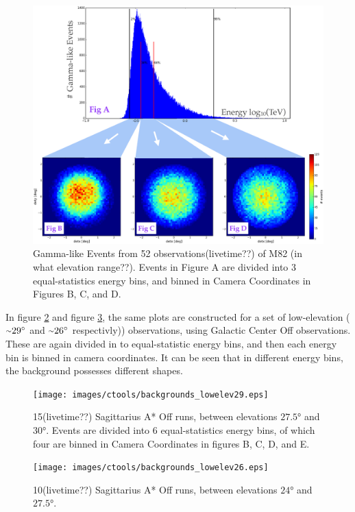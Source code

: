 \begin{figure}[ht]
  \begin{center}
    \includegraphics[width=\textwidth]{images/ctools/backgrounds_highelev.eps}
    \caption[FITS Background at High Elevations]{Gamma-like Events from 52 observations(livetime??) of M82 (in what elevation range??).  Events in Figure A are divided into 3 equal-statistics energy bins, and binned in Camera Coordinates in Figures B, C, and D.}\label{fig:back_highelev}
  \end{center}
\end{figure}


In figure \ref{fig:back_lowelev29} and figure \ref{fig:back_lowelev26}, the same plots are constructed for a set of low-elevation ($ \nicetilde \ang{29} $ and $ \nicetilde \ang{26} $ respectivly)) observations, using Galactic Center Off observations.
These are again divided in to equal-statistic energy bins, and then each energy bin is binned in camera coordinates.
It can be seen that in different energy bins, the background possesses different shapes.

\begin{figure}[ht]
  \begin{center}
    \texttt{[image: images/ctools/backgrounds\_lowelev29.eps]}
    \caption[CTOOLS Background at 29 degrees Elevation]{15(livetime??) Sagittarius A* Off runs, between elevations $ \ang{27.5} $ and $ \ang{30} $.  Events are divided into 6 equal-statistics energy bins, of which four are binned in Camera Coordinates in figures B, C, D, and E.}\label{fig:back_lowelev29}
  \end{center}
\end{figure}

\begin{figure}[ht]
  \begin{center}
    \texttt{[image: images/ctools/backgrounds\_lowelev26.eps]}
    \caption[CTOOLS Background at 26 degrees Elevation]{10(livetime??) Sagittarius A* Off runs, between elevations $ \ang{24} $ and $ \ang{27.5} $. }\label{fig:back_lowelev26}
  \end{center}
\end{figure}






